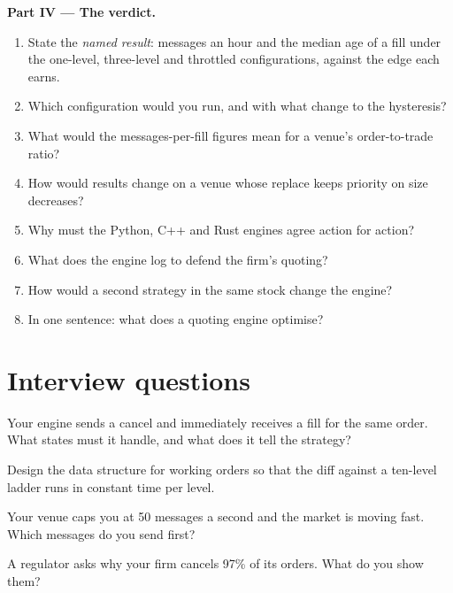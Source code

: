 \begin{problem}
\medskip\noindent\textbf{Part IV --- The verdict.}
\begin{enumerate}[resume]
\item State the \emph{named result}: messages an hour and the median age of a fill under the one-level, three-level and throttled configurations,
against the edge each earns.
\item Which configuration would you run, and with what change to the hysteresis?
\item What would the messages-per-fill figures mean for a venue's order-to-trade ratio?
\item How would results change on a venue whose replace keeps priority on size decreases?
\item Why must the Python, C++ and Rust engines agree action for action?
\item What does the engine log to defend the firm's quoting?
\item How would a second strategy in the same stock change the engine?
\item In one sentence: what does a quoting engine optimise?
\end{enumerate}
\end{problem}

\section{Interview questions}

\begin{interviewq}\label{iq:hf:the-quoting-engine:1}
Your engine sends a cancel and immediately receives a fill for the same order. What states must it handle, and what does it tell the strategy?
\end{interviewq}

\begin{interviewq}\label{iq:hf:the-quoting-engine:2}
Design the data structure for working orders so that the diff against a ten-level ladder runs in constant time per level.
\end{interviewq}

\begin{interviewq}\label{iq:hf:the-quoting-engine:3}
Your venue caps you at 50 messages a second and the market is moving fast. Which messages do you send first?
\end{interviewq}

\begin{interviewq}\label{iq:hf:the-quoting-engine:4}
A regulator asks why your firm cancels 97\% of its orders. What do you show them?
\end{interviewq}

